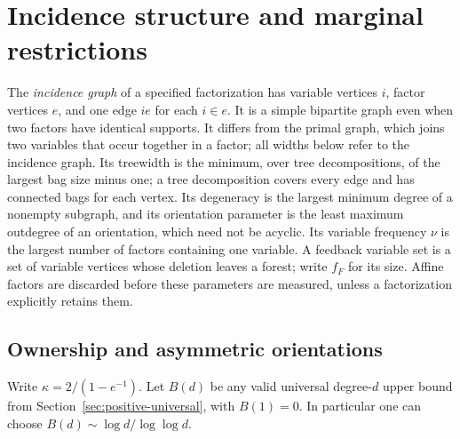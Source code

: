 \section{Incidence structure and marginal restrictions}\label{sec:incidence}
The \emph{incidence graph} of a specified factorization has variable vertices
$i$, factor vertices $e$, and one edge $ie$ for each $i\in e$. It is a
simple bipartite graph even when two factors have identical
supports. It differs from the primal graph, which joins two variables that
occur together in a factor; all widths below refer to the incidence graph.
Its treewidth is the minimum, over tree decompositions, of the largest bag
size minus one; a tree decomposition covers every edge and has connected
bags for each vertex. Its degeneracy is the largest minimum degree of a
nonempty subgraph, and
its orientation parameter is the least maximum outdegree of an orientation,
which need not be acyclic. Its variable frequency $\nu$ is
the largest number of factors containing one variable. A feedback variable
set is a set of variable vertices whose deletion leaves a forest; write
$f_F$ for its size. Affine factors are discarded before these parameters are
measured, unless
a factorization explicitly retains them.

\subsection{Ownership and asymmetric orientations}
Write $\kappa=2/(1-e^{-1})$. Let $B(d)$ be any valid universal degree-$d$
upper bound from Section~\ref{sec:positive-universal}, with $B(1)=0$.
In particular one can choose $B(d)\sim\log d/\log\log d$.

